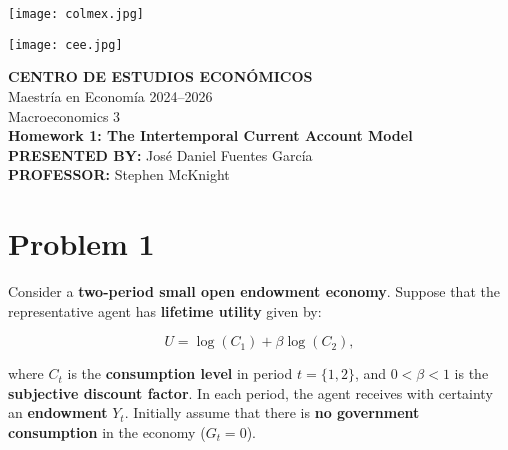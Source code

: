 \documentclass[12pt]{article}
\title{}
\author{}
\date{}
\begin{document}
\begin{titlepage}
    \vspace*{-1cm}
    \noindent
    \begin{minipage}[t]{0.49\textwidth}
        \texttt{[image: colmex.jpg]}
    \end{minipage}%
    \begin{minipage}[t]{0.49\textwidth}
        \raggedleft
        \texttt{[image: cee.jpg]}
    \end{minipage}

    \vspace*{2cm}

    \begin{center}
        \Huge \textbf{CENTRO DE ESTUDIOS ECONÓMICOS} \\[1.5em]
        \Large Maestría en Economía 2024--2026 \\[2em]
        \Large Macroeconomics 3 \\[3em]
        \LARGE \textbf{Homework 1: The Intertemporal Current Account Model} \\[3em]
        \large \textbf{PRESENTED BY:} José Daniel Fuentes García \\[3em]
        \large \textbf{PROFESSOR:} Stephen McKnight \\[0.9em]
        
    \end{center}

    \vfill
\end{titlepage}

\newpage

\setcounter{secnumdepth}{2}
\setcounter{tocdepth}{3}
\tableofcontents


\newpage

\section*{\noindent\textbf{Problem 1}}

\doublespacing

Consider a \textbf{two-period small open endowment economy}. Suppose that the representative agent has \textbf{lifetime utility} given by:

\[
U = \log(C_1) + \beta \log(C_2),
\]

where \( C_t \) is the \textbf{consumption level} in period \( t = \{1,2\} \), and \( 0 < \beta < 1 \) is the \textbf{subjective discount factor}. In each period, the agent receives with certainty an \textbf{endowment} \( Y_t \). Initially assume that there is \textbf{no government consumption} in the economy (\( G_t = 0 \)).
\end{document}
